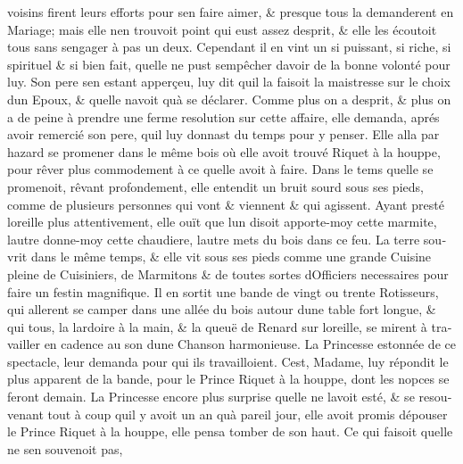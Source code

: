 \documentclass[14pt,a4paper]{memoir}
\begin{document}
\begin{otherlanguage}{french}
voisins firent leurs efforts pour s\textquotesingle en faire aimer, \&
presque tous la demanderent en Mariage; mais elle n\textquotesingle en
trouvoit point qui eust assez d\textquotesingle esprit, \& elle les
écoutoit tous sans s\textquotesingle engager à pas un
d\textquotesingle eux. Cependant il en vint un si puissant, si riche, si
spirituel \& si bien fait, qu\textquotesingle elle ne pust
s\textquotesingle empêcher d\textquotesingle avoir de la bonne volonté
pour luy. Son pere s\textquotesingle en estant apperçeu, luy dit
qu\textquotesingle il la faisoit la maistresse sur le choix
d\textquotesingle un Epoux, \& qu\textquotesingle elle
n\textquotesingle avoit qu\textquotesingle à se déclarer. Comme plus on
a d\textquotesingle esprit, \& plus on a de peine à prendre une ferme
resolution sur cette affaire, elle demanda, aprés avoir remercié son
pere, qu\textquotesingle il luy donnast du temps pour y penser. Elle
alla par hazard se promener dans le même bois où elle avoit trouvé
Riquet à la houppe, pour rêver plus commodement à ce
qu\textquotesingle elle avoit à faire. Dans le tems
qu\textquotesingle elle se promenoit, rêvant profondement, elle entendit
un bruit sourd sous ses pieds, comme de plusieurs personnes qui vont \&
viennent \& qui agissent. Ayant presté l\textquotesingle oreille plus
attentivement, elle ouït que l\textquotesingle un disoit apporte-moy
cette marmite, l\textquotesingle autre donne-moy cette chaudiere,
l\textquotesingle autre mets du bois dans ce feu. La terre
s\textquotesingle ouvrit dans le même temps, \& elle vit sous ses pieds
comme une grande Cuisine pleine de Cuisiniers, de Marmitons \& de toutes
sortes d\textquotesingle Officiers necessaires pour faire un festin
magnifique. Il en sortit une bande de vingt ou trente Rotisseurs, qui
allerent se camper dans une allée du bois autour d\textquotesingle une
table fort longue, \& qui tous, la lardoire à la main, \& la queuë de
Renard sur l\textquotesingle oreille, se mirent à travailler en cadence
au son d\textquotesingle une Chanson harmonieuse. La Princesse estonnée
de ce spectacle, leur demanda pour qui ils travailloient.
C\textquotesingle est, Madame, luy répondit le plus apparent de la
bande, pour le Prince Riquet à la houppe, dont les nopces se feront
demain. La Princesse encore plus surprise qu\textquotesingle elle ne
l\textquotesingle avoit esté, \& se resouvenant tout à coup
qu\textquotesingle il y avoit un an qu\textquotesingle à pareil jour,
elle avoit promis d\textquotesingle épouser le Prince Riquet à la
houppe, elle pensa tomber de son haut. Ce qui faisoit
qu\textquotesingle elle ne s\textquotesingle en souvenoit pas,

\end{otherlanguage}
\end{document}
